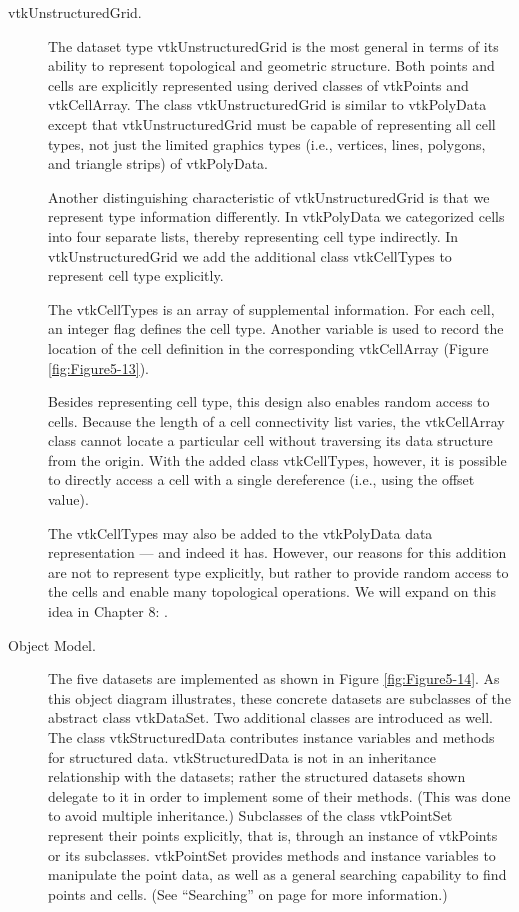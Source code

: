 \begin{description}
\item[vtkUnstructuredGrid.] The dataset type vtkUnstructuredGrid is the most general in terms of its ability to represent topological and geometric structure. Both points and cells are explicitly represented using derived classes of vtkPoints and vtkCellArray. The class vtkUnstructuredGrid is similar to vtkPolyData except that vtkUnstructuredGrid must be capable of representing all cell types, not just the limited graphics types (i.e., vertices, lines, polygons, and triangle strips) of vtkPolyData.

Another distinguishing characteristic of vtkUnstructuredGrid is that we represent type information differently. In vtkPolyData we categorized cells into four separate lists, thereby representing cell type indirectly. In vtkUnstructuredGrid we add the additional class vtkCellTypes to represent cell type explicitly.

The vtkCellTypes is an array of supplemental information. For each cell, an integer flag defines the cell type. Another variable is used to record the location of the cell definition in the corresponding vtkCellArray (Figure \ref{fig:Figure5-13}).

Besides representing cell type, this design also enables random access to cells. Because the length of a cell connectivity list varies, the vtkCellArray class cannot locate a particular cell without traversing its data structure from the origin. With the added class vtkCellTypes, however, it is possible to directly access a cell with a single dereference (i.e., using the offset value).

The vtkCellTypes may also be added to the vtkPolyData data representation — and indeed it has. However, our reasons for this addition are not to represent type explicitly, but rather to provide random access to the cells and enable many topological operations. We will expand on this idea in Chapter 8: .

\item[Object Model.] The five datasets are implemented as shown in Figure \ref{fig:Figure5-14}. As this object diagram illustrates, these concrete datasets are subclasses of the abstract class vtkDataSet. Two additional classes are introduced as well. The class vtkStructuredData contributes instance variables and methods for structured data. vtkStructuredData is not in an inheritance relationship with the datasets; rather the structured datasets shown delegate to it in order to implement some of their methods. (This was done to avoid multiple inheritance.) Subclasses of the class vtkPointSet represent their points explicitly, that is, through an instance of vtkPoints or its subclasses. vtkPointSet provides methods and instance variables to manipulate the point data, as well as a general searching capability to find points and cells. (See ``Searching'' on page \pageref{sec:searching} for more information.)

\end{description}


